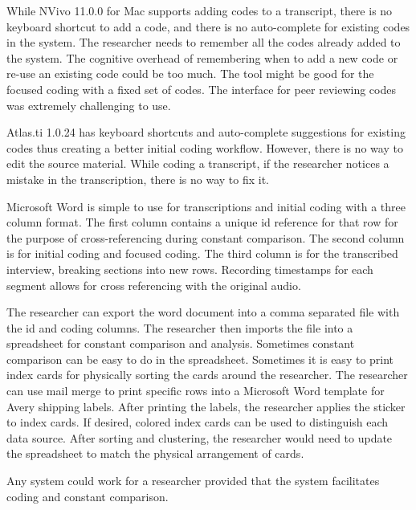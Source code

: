 While NVivo 11.0.0 for Mac supports adding codes to a transcript,  there is no keyboard shortcut to add a code, and there is no auto-complete for existing codes in the system. The researcher needs to remember all the codes already added to the system. The cognitive overhead of remembering when to add a new code or re-use an existing code could be too much. The tool might be good for the focused coding with a fixed set of codes. The interface for peer reviewing codes was extremely challenging to use. 

Atlas.ti 1.0.24 has keyboard shortcuts and auto-complete suggestions for existing codes thus creating a better initial coding workflow. However, there is no way to edit the source material. While coding a transcript, if the researcher notices a mistake in the transcription, there is no way to fix it.

Microsoft Word is simple to use for transcriptions and initial coding with a three column format.  The first column contains a unique id reference for that row for the purpose of cross-referencing during constant comparison. The second column is for initial coding and focused coding. The third column is for the transcribed interview, breaking sections into new rows. Recording timestamps for each segment allows for cross referencing with the original audio. 

The researcher can export the word document into a comma separated file with the id and coding columns. The researcher then imports the file into a spreadsheet for constant comparison and analysis. Sometimes constant comparison can be easy to do in the spreadsheet. Sometimes it is easy to print index cards for physically sorting the cards around the researcher. The researcher can use mail merge to print specific rows into a Microsoft Word template for Avery shipping labels. After printing the labels, the researcher applies the sticker to index cards. If desired, colored index cards can be used to distinguish each data source. After sorting and clustering, the researcher would need to update the spreadsheet to match the physical arrangement of cards.

Any system could work for a researcher provided that the system facilitates coding and constant comparison. 



